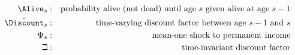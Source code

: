     \begin{eqnarray*}
      \Alive _{s} &:&\text{probability alive (not dead) until age $s$ given alive at age $s-1$}
      \\      {\hat{\Discount}}_{s} &:&\text{time-varying discount factor between age $s-1$ and $s$}
      \\     \Psi_{s} &:&\text{mean-one shock to permanent income}
      \\     \beth &:&\text{time-invariant discount factor}
    \end{eqnarray*}
  
